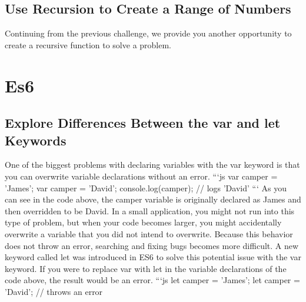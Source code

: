\documentclass{article}%
\begin{document}
%
\subsection{Use Recursion to Create a Range of Numbers}%
\label{subsec:UseRecursiontoCreateaRangeofNumbers}%
Continuing from the previous challenge, we provide you another opportunity to create a recursive function to solve a problem.\newline%

%
\newpage%
\section{Es6}%
\label{sec:Es6}%
\subsection{Explore Differences Between the var and let Keywords}%
\label{subsec:ExploreDifferencesBetweenthevarandletKeywords}%
One of the biggest problems with declaring variables with the var keyword is that you can overwrite variable declarations without an error.\newline%
```js\newline%
var camper = 'James';\newline%
var camper = 'David';\newline%
console.log(camper);\newline%
// logs 'David'\newline%
```\newline%
As you can see in the code above, the camper variable is originally declared as James and then overridden to be David.\newline%
In a small application, you might not run into this type of problem, but when your code becomes larger, you might accidentally overwrite a variable that you did not intend to overwrite.\newline%
Because this behavior does not throw an error, searching and fixing bugs becomes more difficult.\newline%
A new keyword called let was introduced in ES6 to solve this potential issue with the var keyword.\newline%
If you were to replace var with let in the variable declarations of the code above, the result would be an error.\newline%
```js\newline%
let camper = 'James';\newline%
let camper = 'David'; // throws an error\newline%
\end{document}
